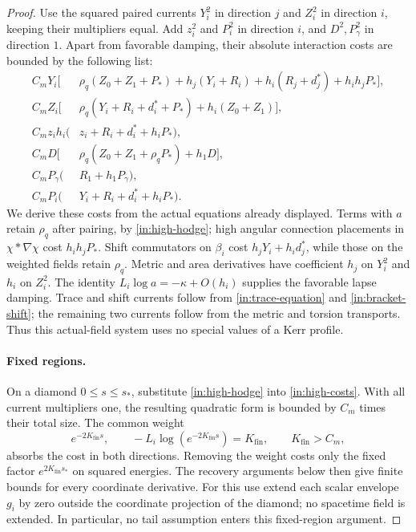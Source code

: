 \begin{proof}
Use the squared paired currents $Y_i^2$ in direction $j$ and
$Z_i^2$ in direction $i$, keeping their multipliers equal.
Add $z_i^2$ and $P_i^2$ in direction $i$, and $D^2,P_\gamma^2$
in direction $1$. Apart from favorable damping, their absolute
interaction costs are bounded by the following list:
\begin{equation}\label{in:high-costs}
\begin{aligned}
 C_mY_i\big[&\rho_q(Z_0+Z_1+P_*)
       +h_j(Y_i+R_i)+h_i(R_j+d_j^*)+h_i h_jP_*\big],\\
 C_mZ_i\big[&\rho_q(Y_i+R_i+d_i^*+P_*)
                                      +h_i(Z_0+Z_1)\big],\\
 C_mz_i h_i(&z_i+R_i+d_i^*+h_iP_*),\\
 C_mD\big[&\rho_q(Z_0+Z_1+\rho_qP_*)+h_1D\big],\\
 C_mP_\gamma(&R_1+h_1P_\gamma),\\
 C_mP_i(&Y_i+R_i+d_i^*+h_iP_*).
\end{aligned}
\end{equation}
We derive these costs from the actual equations already displayed.
Terms with $a$ retain
$\rho_q$ after pairing, by \eqref{in:high-hodge}; high angular
connection placements in $\chi*\nabla\chi$ cost $h_i h_jP_*$.
Shift commutators on $\beta_i$ cost $h_jY_i+h_id_j^*$, while
those on the weighted fields retain $\rho_q$. Metric and area
derivatives have coefficient $h_j$ on $Y_i^2$ and $h_i$ on
$Z_i^2$. The identity $L_i\log a=-\kappa+O(h_i)$ supplies the
favorable lapse damping. Trace and shift currents follow from
\eqref{in:trace-equation} and \eqref{in:bracket-shift}; the remaining
two currents follow from the metric and torsion transports.
Thus this actual-field system uses no special values of a Kerr profile.

\paragraph{Fixed regions.}
On a diamond $0\le s\le s_*$, substitute
\eqref{in:high-hodge} into \eqref{in:high-costs}. With all current
multipliers one, the resulting quadratic form is bounded by $C_m$
times their total size. The common weight
\begin{equation}\label{in:finite-weight}
 e^{-2K_{\mathrm{fin}}s},\qquad
 -L_i\log(e^{-2K_{\mathrm{fin}}s})=K_{\mathrm{fin}},
 \qquad K_{\mathrm{fin}}>C_m,
\end{equation}
absorbs the cost in both directions. Removing the weight costs only
the fixed factor $e^{2K_{\mathrm{fin}}s_*}$ on squared energies.
The recovery arguments below then give finite bounds for every
coordinate derivative. For this use extend each scalar envelope
$g_i$ by zero outside the coordinate projection of the diamond; no
spacetime field is extended. In particular, no tail assumption enters
this fixed-region argument.


\end{proof}
